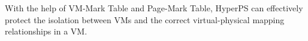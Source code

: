 With the help of VM-Mark Table and Page-Mark Table, HyperPS can effectively protect the isolation between VMs and the correct virtual-physical mapping relationships in a VM. 































